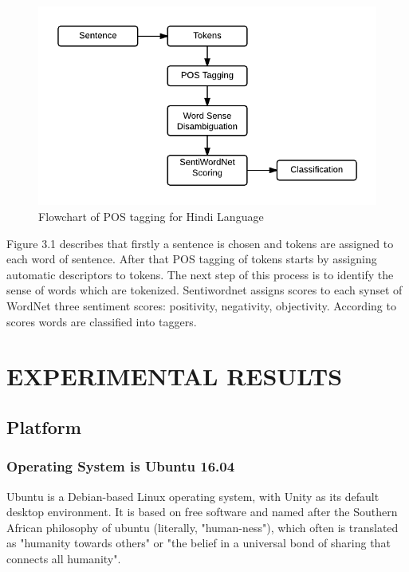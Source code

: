 \documentclass[12pt,a4paper,oneside]{memoir}
\begin{document}
\begin{figure}[h]
    \centering
    \includegraphics[scale=1.0]{jagjit}
    \caption{Flowchart of POS tagging for Hindi Language}
\end{figure}

Figure 3.1 describes that firstly a sentence is chosen and tokens are assigned to each word of sentence. After that POS tagging of tokens starts by assigning automatic descriptors to tokens. The next step of this process is to identify the sense of words which are tokenized. Sentiwordnet assigns scores to each synset of WordNet three sentiment scores: positivity, negativity, objectivity. According to scores words are classified into taggers.



\chapter{EXPERIMENTAL RESULTS}
\section{Platform}
\subsection{Operating System is Ubuntu 16.04}
Ubuntu is a Debian-based Linux operating system, with Unity as its default desktop environment. It is based on free software and named after the Southern African philosophy of ubuntu (literally, "human-ness"), which often is translated as "humanity towards others" or "the belief in a universal bond of sharing that connects all humanity".
\end{document}
